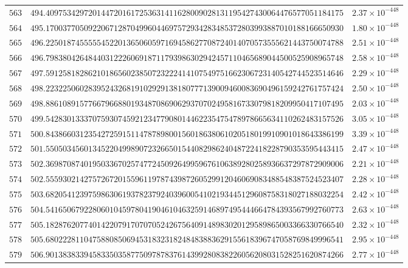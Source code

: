 \documentclass[12pt,reqno]{amsart}
\theoremstyle{remark}
\begin{document}
\begin{longtable}{clc}
$563$ & $494.4097534297201447201617253631411628009028131195427430064476577051184175$ & $2.37\times 10^{-448}$ \\
$564$ & $495.1700377050922067128704996044697572934283485372803993887010188166650930$ & $1.80\times 10^{-448}$ \\
$565$ & $496.2250187455555452201365060597169458627708724014070573555621443750074788$ & $2.51\times 10^{-448}$ \\
$566$ & $496.7983804264844031222606918711793986302942457110465689044500525908965748$ & $2.58\times 10^{-448}$ \\
$567$ & $497.5912581828621018656023850723222414107549751662306723140542744523514646$ & $2.29\times 10^{-448}$ \\
$568$ & $498.2232250602839524326819102929138180777139009460083690496159242761757424$ & $2.50\times 10^{-448}$ \\
$569$ & $498.8861089157766796688019348708690629370702495816733079818209950417107495$ & $2.03\times 10^{-448}$ \\
$570$ & $499.5428301333707593074592123477908014462235475478978665634110262483157526$ & $3.05\times 10^{-448}$ \\
$571$ & $500.8438660312354272591511478789800156018638061020518019910901018643386199$ & $3.39\times 10^{-448}$ \\
$572$ & $501.5505034560134522049989072326650154408298624048722418228790353595443415$ & $2.47\times 10^{-448}$ \\
$573$ & $502.3698708740195033670257477245092649959676106389280258936637297872909006$ & $2.21\times 10^{-448}$ \\
$574$ & $502.5559302142757267201559611978743987260529912046069083488548387524523407$ & $2.28\times 10^{-448}$ \\
$575$ & $503.6820541239759863061937823792403960054102193445129608758318027188032254$ & $2.42\times 10^{-448}$ \\
$576$ & $504.5416506792280601045978041904610463259146897495444664784393567992760773$ & $2.63\times 10^{-448}$ \\
$577$ & $505.1828762077401422079170707052426756409148983020129589865003366330766540$ & $2.32\times 10^{-448}$ \\
$578$ & $505.6802228110475880850694531832318248483883629155618396747058769849996541$ & $2.95\times 10^{-448}$ \\
$579$ & $506.9013838339458335035877509787837614399280838226056208031528251620874266$ & $2.77\times 10^{-448}$ \\

\end{longtable}
\end{document}
